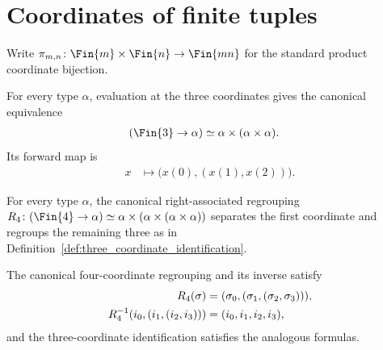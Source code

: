 \section{Coordinates of finite tuples}

Write $\pi_{m,n}\colon\Fin{m}\times\Fin{n}\to\Fin{mn}$ for the standard
product coordinate bijection.

\begin{definition}
    \label{def:three_coordinate_identification}
    \leanok
    For every type $\alpha$, evaluation at the three coordinates gives the
    canonical equivalence
    \begin{align}
        (\Fin{3}\to\alpha) & \simeq\alpha\times(\alpha\times\alpha).
        \label{eq:ph_three_coordinate_equiv}
    \end{align}
    Its forward map is
    \begin{align}
        x & \longmapsto\bigl(x(0),(x(1),x(2))\bigr).
        \label{eq:ph_three_coordinate_forward}
    \end{align}
\end{definition}

\begin{definition}
    \label{def:four_coordinate_identification}
    \leanok
    For every type $\alpha$, the canonical right-associated regrouping
    $R_4\colon(\Fin{4}\to\alpha)\simeq\alpha\times(\alpha\times(\alpha\times\alpha))$
    separates the first coordinate and regroups the remaining three as in
    Definition~\ref{def:three_coordinate_identification}.
\end{definition}

\begin{lemma}
    \label{lem:fin_four_arrow_equiv_coordinates}
    \leanok
    The canonical four-coordinate regrouping and its inverse satisfy
    \begin{align}
        R_4(\sigma)
         & =(\sigma_0,(\sigma_1,(\sigma_2,\sigma_3))),
        \notag                                         \\
        R_4^{-1}(i_0,(i_1,(i_2,i_3)))
         & =(i_0,i_1,i_2,i_3),
        \notag
    \end{align}
    and the three-coordinate identification satisfies the analogous
    formulas.
\end{lemma}

